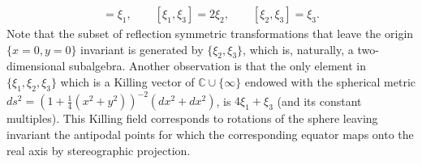 \begin{align*}
[ \xi_1, \xi_2] = \xi_1, \quad \quad
[ \xi_1, \xi_3] = 2\xi_2, \quad \quad
[\xi_2,\xi_3] = \xi_3.
\end{align*}
Note that the subset of reflection symmetric
transformations that leave the origin $\{x=0,y=0\}$
invariant is generated by $\{\xi_2,\xi_3\}$, which is, naturally,
a two-dimensional subalgebra. Another observation is that 
the only element in $\{ \xi_1,\xi_2,\xi_3\}$ which is a Killing vector
of $\mathbb{C} \cup \{ \infty \}$ endowed with the spherical metric
$ds^2 = \left ( 1 + \frac{1}{4} (x^2 + y^2) \right )^{-2} (dx^2 + dx^2)$,
is $4 \xi_1 + \xi_3$ (and its constant multiples). This Killing field
corresponds to rotations of the sphere leaving invariant the 
antipodal points for which the corresponding equator maps onto the real axis by stereographic projection.



